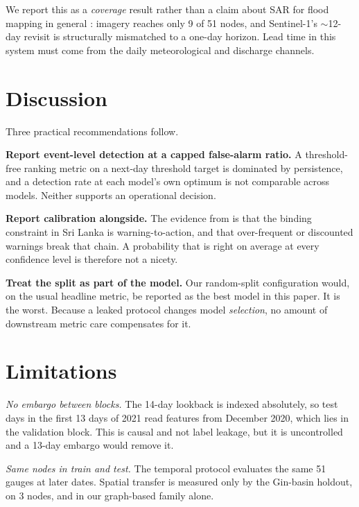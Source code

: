 \documentclass[conference]{IEEEtran}
\begin{document}
We report this as a \emph{coverage} result rather than a claim about SAR for
flood mapping in general \cite{bonafilia2020}: imagery reaches only 9 of 51
nodes, and Sentinel-1's $\sim$12-day revisit is structurally mismatched to a
one-day horizon. Lead time in this system must come from the daily meteorological
and discharge channels.

\section{Discussion}

Three practical recommendations follow.

\textbf{Report event-level detection at a capped false-alarm ratio.} A
threshold-free ranking metric on a next-day threshold target is dominated by
persistence, and a detection rate at each model's own optimum is not comparable
across models. Neither supports an operational decision.

\textbf{Report calibration alongside.} The evidence from
\cite{partheepan2026} is that the binding constraint in Sri Lanka is
warning-to-action, and that over-frequent or discounted warnings break that
chain. A probability that is right on average at every confidence level is
therefore not a nicety.

\textbf{Treat the split as part of the model.} Our random-split configuration
would, on the usual headline metric, be reported as the best model in this paper.
It is the worst. Because a leaked protocol changes model \emph{selection}, no
amount of downstream metric care compensates for it.

\section{Limitations}

\emph{No embargo between blocks.} The 14-day lookback is indexed absolutely, so
test days in the first 13 days of 2021 read features from December 2020, which
lies in the validation block. This is causal and not label leakage, but it is
uncontrolled and a 13-day embargo would remove it.

\emph{Same nodes in train and test.} The temporal protocol evaluates the same 51
gauges at later dates. Spatial transfer is measured only by the Gin-basin
holdout, on 3 nodes, and in our graph-based family alone.
\end{document}
